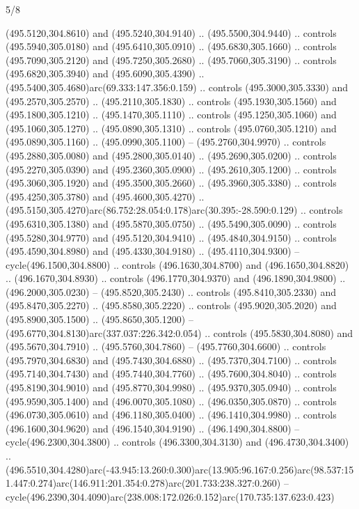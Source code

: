 \begin{flagdescription}{5/8}
\begin{scope}[xshift=0.5\flaglength,yshift=0.5\flagwidth,scale=\flagwidth/475.63]
\begin{scope}[y=0.8pt, x=0.8pt, yscale=-1, xscale=1,shift={(-450,-300)}]
\begin{scope}[cm={{1.0,0.0,0.0,1.0,(-0.0002,0.12556)}},cm={{1.0,0.0,0.0,1.0,(0.00179,0.0)}}]
\begin{scope}[cm={{1.11592,0.0,0.0,1.11592,(-106.89933,-41.77764)}}]
\begin{scope}[draw=black,fill=cfff]
\begin{scope}[fill=black]
  (495.5120,304.8610) and (495.5240,304.9140) .. (495.5500,304.9440) .. controls
  (495.5940,305.0180) and (495.6410,305.0910) .. (495.6830,305.1660) .. controls
  (495.7090,305.2120) and (495.7250,305.2680) .. (495.7060,305.3190) .. controls
  (495.6820,305.3940) and (495.6090,305.4390) ..
  (495.5400,305.4680)arc(69.333:147.356:0.159) .. controls (495.3000,305.3330)
  and (495.2570,305.2570) .. (495.2110,305.1830) .. controls (495.1930,305.1560)
  and (495.1800,305.1210) .. (495.1470,305.1110) .. controls (495.1250,305.1060)
  and (495.1060,305.1270) .. (495.0890,305.1310) .. controls (495.0760,305.1210)
  and (495.0890,305.1160) .. (495.0990,305.1100) -- (495.2760,304.9970) ..
  controls (495.2880,305.0080) and (495.2800,305.0140) .. (495.2690,305.0200) ..
  controls (495.2270,305.0390) and (495.2360,305.0900) .. (495.2610,305.1200) ..
  controls (495.3060,305.1920) and (495.3500,305.2660) .. (495.3960,305.3380) ..
  controls (495.4250,305.3780) and (495.4600,305.4270) ..
  (495.5150,305.4270)arc(86.752:28.054:0.178)arc(30.395:-28.590:0.129) ..
  controls (495.6310,305.1380) and (495.5870,305.0750) .. (495.5490,305.0090) ..
  controls (495.5280,304.9770) and (495.5120,304.9410) .. (495.4840,304.9150) ..
  controls (495.4590,304.8980) and (495.4330,304.9180) .. (495.4110,304.9300) --
  cycle(496.1500,304.8800) .. controls (496.1630,304.8700) and
  (496.1650,304.8820) .. (496.1670,304.8930) .. controls (496.1770,304.9370) and
  (496.1890,304.9800) .. (496.2000,305.0230) -- (495.8520,305.2430) .. controls
  (495.8410,305.2330) and (495.8470,305.2270) .. (495.8580,305.2220) .. controls
  (495.9020,305.2020) and (495.8900,305.1500) .. (495.8650,305.1200) --
  (495.6770,304.8130)arc(337.037:226.342:0.054) .. controls (495.5830,304.8080)
  and (495.5670,304.7910) .. (495.5760,304.7860) -- (495.7760,304.6600) ..
  controls (495.7970,304.6830) and (495.7430,304.6880) .. (495.7370,304.7100) ..
  controls (495.7140,304.7430) and (495.7440,304.7760) .. (495.7600,304.8040) ..
  controls (495.8190,304.9010) and (495.8770,304.9980) .. (495.9370,305.0940) ..
  controls (495.9590,305.1400) and (496.0070,305.1080) .. (496.0350,305.0870) ..
  controls (496.0730,305.0610) and (496.1180,305.0400) .. (496.1410,304.9980) ..
  controls (496.1600,304.9620) and (496.1540,304.9190) .. (496.1490,304.8800) --
  cycle(496.2300,304.3800) .. controls (496.3300,304.3130) and
  (496.4730,304.3400) ..
  (496.5510,304.4280)arc(-43.945:13.260:0.300)arc(13.905:96.167:0.256)arc(98.537:151.447:0.274)arc(146.911:201.354:0.278)arc(201.733:238.327:0.260)
  --
  cycle(496.2390,304.4090)arc(238.008:172.026:0.152)arc(170.735:137.623:0.423)

\end{scope}
\end{scope}
\end{scope}
\end{scope}
\end{scope}
\end{scope}
\end{flagdescription}
